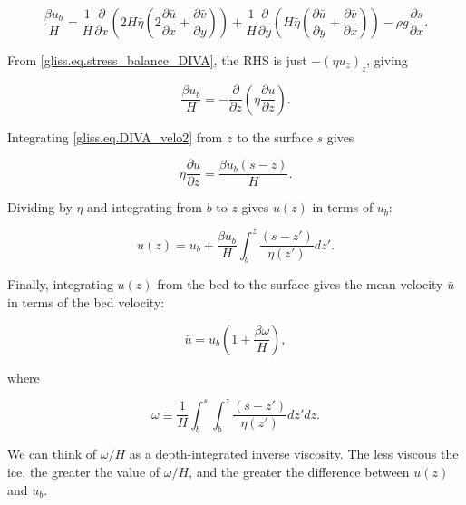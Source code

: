 {\begin{equation}
  \label{gliss.eq.DIVA.velo1}
  \frac {\beta u_b}{H} =
     \frac{1}{H} \frac{\partial }{\partial x}\left( 2H \bar{\eta} \left(2\frac{\partial \bar{u}}{\partial x} + \frac{\partial \bar{v}}{\partial y} \right) \right) 
   + \frac{1}{H} \frac{\partial }{\partial y}\left(  H \bar{\eta} \left( \frac{\partial \bar{u}}{\partial y} + \frac{\partial \bar{v}}{\partial x} \right) \right) 
   - \rho g \frac{\partial s}{\partial x}.
\end{equation}

\noindent
From \eqref{gliss.eq.stress_balance_DIVA}, the RHS is just $-(\eta u_z)_z$, giving

\begin{equation}
  \label{gliss.eq.DIVA_velo2}
  \frac{\beta u_b}{H} = -\frac{\partial }{\partial z}\left( \eta \frac{\partial u}{\partial z} \right).
\end{equation}

\noindent
Integrating \eqref{gliss.eq.DIVA_velo2} from $z$ to the surface $s$ gives

\begin{equation}
  \label{gliss.eq.DIVA_velo3}
  \eta \frac{\partial u}{\partial z} = \frac{\beta {{u}_{b}}\left( s-z \right)}{H}.
\end{equation}

\noindent
Dividing by $\eta$ and integrating from $b$ to $z$ gives $u(z)$
in terms of $u_b$:

\begin{equation}
  \label{gliss.eq.DIVA_velo4}
  u(z) = u_b + \frac{\beta {{u}_{b}}}{H}\int_{b}^{z}{\frac{\left( s-{z}' \right)}{\eta ({z}')}}d{z}'.
\end{equation}

\noindent
Finally, integrating $u(z)$ from the bed to the surface gives the mean velocity $\bar{u}$
in terms of the bed velocity:

\begin{equation}
  \label{gliss.eq.DIVA_velo5}
  \bar{u} = {{u}_{b}}\left( 1+\frac{\beta \omega }{H} \right),
\end{equation}

\noindent
where

\begin{equation}
  \label{gliss.eq.DIVA_omega}
  \omega \equiv \frac{1}{H}\int_{b}^{s}{\int_{b}^{z}{\frac{\left( s-{z}' \right)}{\eta ({z}')}}}d{z}'dz.
\end{equation}

\noindent
We can think of $\omega/H$ as a depth-integrated inverse viscosity.
The less viscous the ice, the greater the value of $\omega/H$, and
the greater the difference between $u(z)$ and $u_b$.  

}
